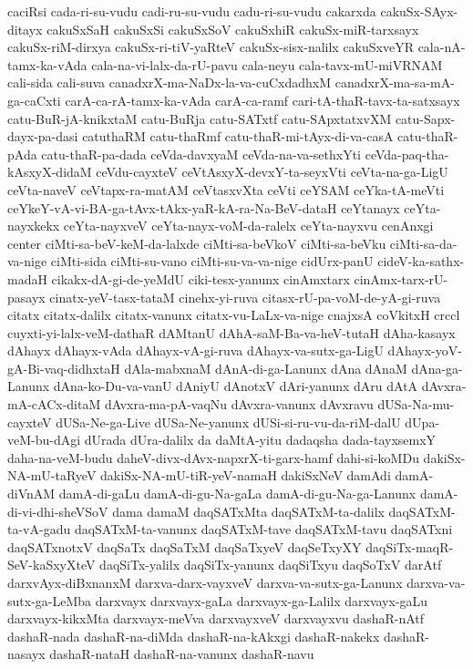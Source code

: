 {caciRsi
cada-ri-su-vudu
cadi-ru-su-vudu
cadu-ri-su-vudu
cakarxda
cakuSx-SAyx-ditayx
cakuSxSaH
cakuSxSi
cakuSxSoV
cakuSxhiR
cakuSx-miR-tarxsayx
cakuSx-riM-dirxya
cakuSx-ri-tiV-yaRteV
cakuSx-sisx-nalilx
cakuSxveYR
cala-nA-tamx-ka-vAda
cala-na-vi-lalx-da-rU-pavu
cala-neyu
cala-tavx-mU-miVRNAM
cali-sida
cali-suva
canadxrX-ma-NaDx-la-va-cuCxdadhxM
canadxrX-ma-sa-mA-ga-caCxti
carA-ca-rA-tamx-ka-vAda
carA-ca-ramf
cari-tA-thaR-tavx-ta-satxsayx
catu-BuR-jA-knikxtaM
catu-BuRja
catu-SATxtf
catu-SApxtatxvXM
catu-Sapx-dayx-pa-dasi
catuthaRM
catu-thaRmf
catu-thaR-mi-tAyx-di-va-casA
catu-thaR-pAda
catu-thaR-pa-dada
ceVda-davxyaM
ceVda-na-va-sethxYti
ceVda-paq-tha-kAsxyX-didaM
ceVdu-cayxteV
ceVtAsxyX-devxY-ta-seyxVti
ceVta-na-ga-LigU
ceVta-naveV
ceVtapx-ra-matAM
ceVtasxvXta
ceVti
ceYSAM
ceYka-tA-meVti
ceYkeY-vA-vi-BA-ga-tAvx-tAkx-yaR-kA-ra-Na-BeV-dataH
ceYtanayx
ceYta-nayxkekx
ceYta-nayxveV
ceYta-nayx-voM-da-ralelx
ceYta-nayxvu
cenAnxgi
center
ciMti-sa-beV-keM-da-lalxde
ciMti-sa-beVkoV
ciMti-sa-beVku
ciMti-sa-da-va-nige
ciMti-sida
ciMti-su-vano
ciMti-su-va-va-nige
cidUrx-panU
cideV-ka-sathx-madaH
cikakx-dA-gi-de-yeMdU
ciki-tesx-yanunx
cinAmxtarx
cinAmx-tarx-rU-pasayx
cinatx-yeV-tasx-tataM
cinehx-yi-ruva
citasx-rU-pa-voM-de-yA-gi-ruva
citatx
citatx-dalilx
citatx-vanunx
citatx-vu-LaLx-va-nige
cnajxsA
coVkitxH
crccl
cuyxti-yi-lalx-veM-dathaR
dAMtanU
dAhA-saM-Ba-va-heV-tutaH
dAha-kasayx
dAhayx
dAhayx-vAda
dAhayx-vA-gi-ruva
dAhayx-va-sutx-ga-LigU
dAhayx-yoV-gA-Bi-vaq-didhxtaH
dAla-mabxnaM
dAnA-di-ga-Lanunx
dAna
dAnaM
dAna-ga-Lanunx
dAna-ko-Du-va-vanU
dAniyU
dAnotxV
dAri-yanunx
dAru
dAtA
dAvxra-mA-cACx-ditaM
dAvxra-ma-pA-vaqNu
dAvxra-vanunx
dAvxravu
dUSa-Na-mu-cayxteV
dUSa-Ne-ga-Live
dUSa-Ne-yanunx
dUSi-si-ru-vu-da-riM-dalU
dUpa-veM-bu-dAgi
dUrada
dUra-dalilx
da
daMtA-yitu
dadaqsha
dada-tayxsemxY
daha-na-veM-budu
daheV-divx-dAvx-napxrX-ti-garx-hamf
dahi-si-koMDu
dakiSx-NA-mU-taRyeV
dakiSx-NA-mU-tiR-yeV-namaH
dakiSxNeV
damAdi
damA-diVnAM
damA-di-gaLu
damA-di-gu-Na-gaLa
damA-di-gu-Na-ga-Lanunx
damA-di-vi-dhi-sheVSoV
dama
damaM
daqSATxMta
daqSATxM-ta-dalilx
daqSATxM-ta-vA-gadu
daqSATxM-ta-vanunx
daqSATxM-tave
daqSATxM-tavu
daqSATxni
daqSATxnotxV
daqSaTx
daqSaTxM
daqSaTxyeV
daqSeTxyXY
daqSiTx-maqR-SeV-kaSxyXteV
daqSiTx-yalilx
daqSiTx-yanunx
daqSiTxyu
daqSoTxV
darAtf
darxvAyx-diBxnanxM
darxva-darx-vayxveV
darxva-va-sutx-ga-Lanunx
darxva-va-sutx-ga-LeMba
darxvayx
darxvayx-gaLa
darxvayx-ga-Lalilx
darxvayx-gaLu
darxvayx-kikxMta
darxvayx-meVva
darxvayxveV
darxvayxvu
dashaR-nAtf
dashaR-nada
dashaR-na-diMda
dashaR-na-kAkxgi
dashaR-nakekx
dashaR-nasayx
dashaR-nataH
dashaR-na-vanunx
dashaR-navu
}

